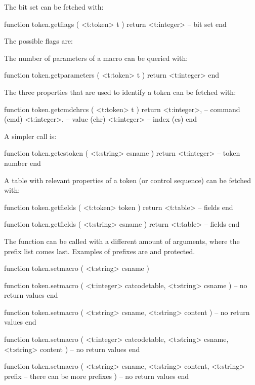 The bit set can be fetched with:

\starttyping[option=LUA]
function token.getflags ( <t:token> t )
    return <t:integer> -- bit set
end
\stoptyping

The possible flags are:

\startcolumns[n=3]
\stopcolumns

The number of parameters of a macro can be queried with:

\starttyping[option=LUA]
function token.getparameters ( <t:token> t )
    return <t:integer>
end
\stoptyping

The three properties that are used to identify a token can be fetched with:

\starttyping[option=LUA]
function token.getcmdchrcs ( <t:token> t )
    return
        <t:integer>, -- command (cmd)
        <t:integer>, -- value   (chr)
        <t:integer>  -- index   (cs)
end
\stoptyping

A simpler call is:

\starttyping[option=LUA]
function token.getcstoken ( <t:string> csname )
    return <t:integer> -- token number
end
\stoptyping

A table with relevant properties of a token (or control sequence) can be fetched
with:

\starttyping[option=LUA]
function token.getfields ( <t:token> token )
    return <t:table> -- fields
end

function token.getfields ( <t:string> csname )
    return <t:table> -- fields
end
\stoptyping

\stopsubsection

\startsubsection[title={Setters}]

The  function can be called with a different amount of arguments,
where the prefix list comes last. Examples of prefixes are  and \type
{protected}.

\starttyping[option=LUA]
function token.setmacro (
    <t:string> csname
)

function token.setmacro (
    <t:integer> catcodetable,
    <t:string>  csname
)
    -- no return values
end

function token.setmacro (
    <t:string> csname,
    <t:string> content
)
    -- no return values
end

function token.setmacro (
    <t:integer> catcodetable,
    <t:string>  csname,
    <t:string>  content
)
    -- no return values
end

function token.setmacro (
    <t:string> csname,
    <t:string> content,
    <t:string> prefix
 -- there can be more prefixes
)
    -- no return values
end

